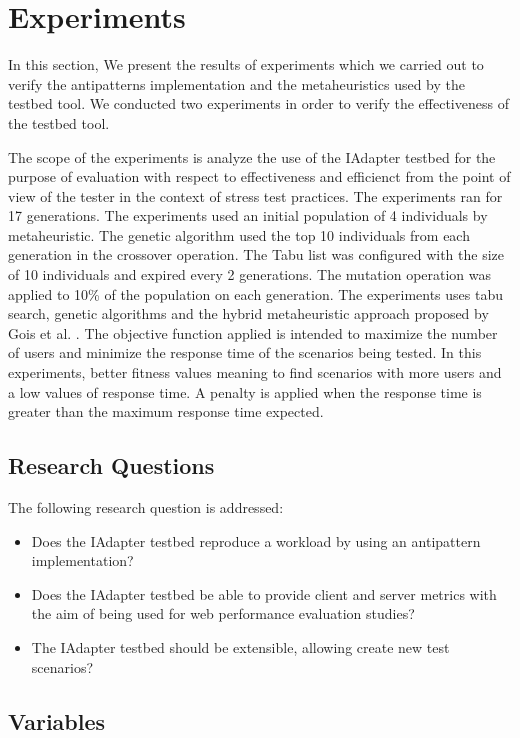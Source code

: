 \section{Experiments}

In this section, We present the results of experiments which we carried out to verify the antipatterns  implementation and the metaheuristics used by the testbed tool. We conducted two experiments in order to verify the effectiveness of the testbed tool.

The scope of the experiments is analyze the use of the IAdapter testbed  for the purpose of evaluation with respect to effectiveness and efficienct from the point of view of the tester in the context of  stress test  practices.  The experiments ran for 17 generations. The experiments used an initial population of 4 individuals by metaheuristic. The genetic algorithm used the top 10 individuals from each generation in the crossover operation. The Tabu list was configured with the size of 10 individuals and expired every 2 generations.  The mutation operation was applied to 10\% of the population on each generation. The experiments uses tabu search, genetic algorithms and the hybrid metaheuristic approach proposed by Gois et al. \cite{Gois2016}. The objective function applied is intended to maximize the number of users and minimize the response time of the scenarios being tested.  In this experiments, better fitness values meaning to find scenarios with more users and a low values of response time. A penalty is applied when the response time is greater than the  maximum response time expected. 

\subsection{Research Questions}

The following research question is addressed:
\begin{itemize}
\item Does the IAdapter testbed reproduce a workload by using an antipattern implementation?
\item Does the IAdapter testbed be able to provide client and server metrics with the aim of being used for web performance evaluation studies?
\item The IAdapter testbed should be extensible, allowing create new test scenarios?
\end{itemize}

\subsection{Variables}

